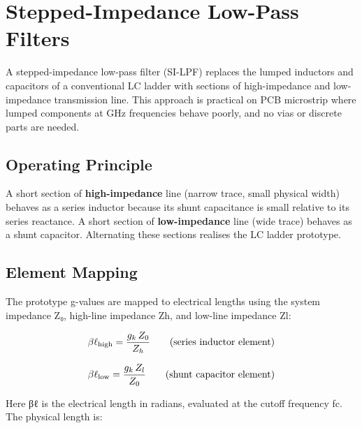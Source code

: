 \section{Stepped-Impedance Low-Pass Filters}\label{sec:wiki_stepped_impedance}



A stepped-impedance low-pass filter (SI-LPF) replaces the lumped inductors and capacitors of a conventional LC ladder with sections of high-impedance and low-impedance transmission line. This approach is practical on PCB microstrip where lumped components at GHz frequencies behave poorly, and no vias or discrete parts are needed.

				

\subsection{Operating Principle}

				

A short section of \textbf{high-impedance} line (narrow trace, small physical width) behaves as a series inductor because its shunt capacitance is small relative to its series reactance. A short section of \textbf{low-impedance} line (wide trace) behaves as a shunt capacitor. Alternating these sections realises the LC ladder prototype.

				


				

\subsection{Element Mapping}

				

The prototype g-values are mapped to electrical lengths using the system impedance Z₀, high-line impedance Zh, and low-line impedance Zl:

				
\[\beta\ell_{\rm high} = \dfrac{g_k\,Z_0}{Z_h}\qquad \text{(series inductor element)}\]

				
\[\beta\ell_{\rm low} = \dfrac{g_k\,Z_l}{Z_0}\qquad \text{(shunt capacitor element)}\]

				

Here βℓ is the electrical length in radians, evaluated at the cutoff frequency fc. The physical length is:

